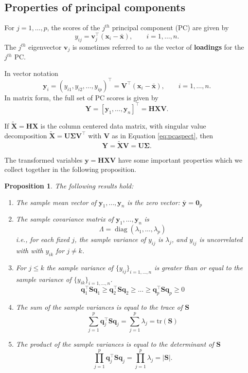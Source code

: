 \documentclass[]{book}
\newtheorem{proposition}{Proposition}[chapter]
\theoremstyle{definition}
\theoremstyle{definition}
\theoremstyle{definition}
\theoremstyle{remark}
\begin{document}
\hypertarget{properties-of-principal-components}{%
\subsection{Properties of principal components}\label{properties-of-principal-components}}

For \(j=1, \ldots , p\), the scores of the \(j^{th}\) principal component (PC) are given by
\[
y_{ij}=\mathbf v_j^\top(\mathbf x_i - \bar{\mathbf x}), \qquad i=1, \ldots , n.
\]
The \(j^{th}\) eigenvector \(\mathbf v_j\) is sometimes referred to as the vector of \textbf{loadings} for the \(j^{th}\) PC.

In vector notation
\[
\mathbf y_i=( y_{i1}, y_{i2}, \ldots , y_{ip})^\top = \mathbf V^\top (\mathbf x_i -\bar{\mathbf x}), \qquad i=1, \ldots ,n.
\]
In matrix form, the full set of PC scores is given by
\[
\mathbf Y= [\mathbf y_1 , \ldots , \mathbf y_n]^\top =\mathbf H\mathbf X\mathbf V.
\]

If \(\tilde{\mathbf X}=\mathbf H\mathbf X\) is the column centered data matrix, with singular value decomposition
\(\tilde{\mathbf X}=\mathbf U\boldsymbol{\Sigma}\mathbf V^\top\) with \(\mathbf V\) as in Equation \eqref{eq:pcaspect}, then
\[\mathbf Y= \tilde{\mathbf X}\mathbf V= \mathbf U\boldsymbol{\Sigma}.\]

The transformed variables \(\mathbf y= \mathbf H\mathbf X\mathbf V\) have some important properties which we collect together in the following proposition.

\begin{proposition}
\protect\hypertarget{prp:pca2}{}{\label{prp:pca2} }The following results hold:

\begin{enumerate}
\def\labelenumi{\arabic{enumi}.}
\item
  The sample mean vector of \(\mathbf y_1, \ldots , \mathbf y_n\) is the zero vector: \(\bar{\mathbf y}={\mathbf 0}_p\)
\item
  The sample covariance matrix of \(\mathbf y_1, \ldots, \mathbf y_n\) is
  \[\Lambda = \operatorname{diag}(\lambda_1, \ldots, \lambda_p)\]
  i.e., for each fixed \(j\), the sample variance of \(y_{ij}\) is \(\lambda_j\), and \(y_{ij}\) is uncorrelated with with \(y_{ik}\) for \(j\not = k\).
\item
  For \(j\leq k\) the sample variance of \(\{y_{ij}\}_{i=1, \ldots , n}\) is greater than or equal to the sample variance of \(\{y_{ik}\}_{i=1, \ldots , n}\).
  \[\mathbf q_1^\top \mathbf S\mathbf q_1 \geq \mathbf q_2^\top \mathbf S\mathbf q_2 \geq \ldots \geq \mathbf q_p^\top \mathbf S\mathbf q_p\geq 0\]
\item
  The sum of the sample variances is equal to the trace of \(\mathbf S\)
  \[\sum_{j=1}^p \mathbf q_j^\top \mathbf S\mathbf q_j = \sum_{j=1}^p \lambda_j = \text{tr}(\mathbf S)\]
\item
  The product of the sample variances is equal to the determinant of \(\mathbf S\)
  \[\prod_{j=1}^p \mathbf q_j^\top \mathbf S\mathbf q_j = \prod_{j=1}^p \lambda_j = |\mathbf S|.\]
\end{enumerate}
\end{proposition}
\end{document}
